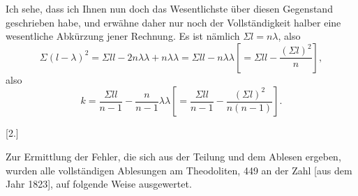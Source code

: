 \par\noindent\hspace*{\parindent}Ich sehe, dass ich Ihnen nun doch das Wesentlichste über diesen Gegenstand geschrieben habe, und erwähne daher nur noch der Vollständigkeit halber eine wesentliche Abkürzung jener Rechnung. Es ist nämlich $\Sigma l=n\lambda$, also
\[
\Sigma(l-\lambda)^2=\Sigma ll-2n\lambda\lambda+n\lambda\lambda=\Sigma ll-n\lambda\lambda
\left[=\Sigma ll-\frac{(\Sigma l)^2}{n}\right],
\]
\noindent also
\[
k=\frac{\Sigma ll}{n-1}-\frac{n}{n-1}\lambda\lambda
\left[=\frac{\Sigma ll}{n-1}-\frac{(\Sigma l)^2}{n(n-1)}\right].
\]
\par\bigskip\bigskip
\begin{center}{\large [2.]}\end{center}
\par\noindent\hspace*{\parindent}Zur Ermittlung der Fehler, die sich aus der Teilung und dem Ablesen ergeben, wurden alle vollständigen Ablesungen am Theodoliten, 449 an der Zahl [aus dem Jahr 1823], auf folgende Weise ausgewertet.

